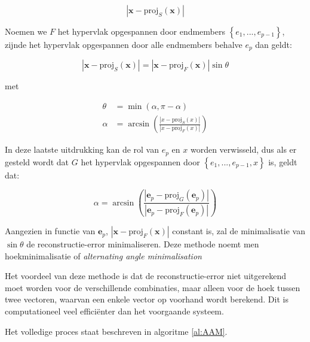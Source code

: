 \documentclass[12pt]{report}
\newcommand{\proj}[2]{\text{proj}_{#2}\left(#1\right)}
\begin{document}
\begin{equation}
\left| \bm{x} - \proj{\bm{x}}{S}\right|
\end{equation}

Noemen we $F$ het hypervlak opgespannen door endmembers $\left\{ e_1 , ... , e_{p-1} \right\}$, zijnde het hypervlak opgespannen door alle endmembers behalve $e_p$ dan geldt:

\begin{equation}
\left| \bm{x} - \proj{\bm{x}}{S}\right|  = \left| \bm{x} - \proj{\bm{x}}{F}\right| \sin \theta
\end{equation}

met 

\begin{align}
\theta &= \min(\alpha, \pi-\alpha) \\
\alpha &= \arcsin \left(\frac{\left|x - \proj{x}{S}\right|}{\left|x - \proj{x}{F}\right|}\right)
\end{align}

In deze laatste uitdrukking kan de rol van $e_p$ en $x$ worden verwisseld, dus als er gesteld wordt dat $G$ het hypervlak opgespannen door $\left\{ e_1 , ... ,e_{p-1}, x \right\}$ is, geldt dat:

\begin{equation}
\alpha = \arcsin \left(\frac{\left|\bm{e}_p - \proj{\bm{e}_p}{G}\right|}{\left|\bm{e}_p - \proj{\bm{e}_p}{F}\right|}\right)
\end{equation} 

Aangezien in functie van $\bm{e}_p$, $\left| \bm{x} - \proj{\bm{x}}{F}\right|$ constant is, zal de minimalisatie van $\sin \theta$ de reconstructie-error minimaliseren. Deze methode noemt men hoekminimalisatie of \textit{alternating angle minimalisation}

Het voordeel van deze methode is dat de reconstructie-error niet uitgerekend moet worden voor de verschillende combinaties, maar alleen voor de hoek tussen twee vectoren, waarvan een enkele vector op voorhand wordt berekend. Dit is computationeel veel effici\"enter dan het voorgaande systeem.

\vspace{5 mm}

Het volledige proces staat beschreven in algoritme \ref{al:AAM}.
\end{document}
